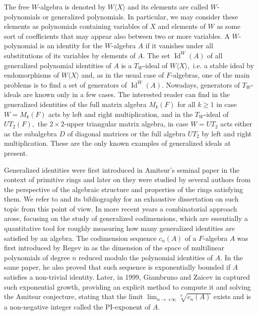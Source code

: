 \documentclass[reqno]{amsart}
\theoremstyle{definition}
\numberwithin{equation}{section}
\numberwithin{theorem}{section}
\newcommand{\W}{W\langle X\rangle}
\DeclareMathOperator{\I}{Id}
\begin{document}
The free $W$-algebra is denoted by $\W$ and its elements are called $W$-polynomials or generalized polynomials. In particular, we may consider these elements as polynomials containing variables of $X$ and elements of $W$ as some sort of coefficients that may appear also between two or more variables. A $W$-polynomial is an identity for the $W$-algebra $A$ if it vanishes under all substitutions of its variables by elements of $A.$ The set $\I^W(A)$ of all generalized polynomial identities of $A$ is a $T_W$-ideal of $\W,$ i.e. a stable ideal by endomorphisms of $\W$ and, as in the usual case of $F$-algebras, one of the main problems is to find a set of generators of $\I^W(A).$ Nowadays, generators of $T_W$-ideals are known only in a few cases. The interested reader can find in \cite[Proposition 6.5.5]{BeidarMartindaleMikhalevm1996} the generalized identities of the full matrix algebra $M_k(F)$ for all $k\geq 1$ in case $W= M_k(F)$ acts by left and right multiplication, and in \cite{MartinoRizzo2024} the $T_W$-ideal of $UT_2(F),$ the $2\times 2$-upper triangular matrix algebra, in case $W=UT_2$ acts either as the subalgebra $D$ of diagonal matrices or the full algebra $UT_2$ by left and right multiplication.
These are the only known examples of generalized ideals at present.

Generalized identities were first introduced in Amitsur’s seminal paper \cite{Amitsur1965} in the context of primitive rings and later on they were studied by several authors from the perspective of the algebraic structure and properties of the rings satisfying them. We refer to \cite{BeidarMartindaleMikhalevm1996} and its bibliography for an exhaustive dissertation on such topic from this point of view. In more recent years a combinatorial approach arose, focusing on the study of generalized codimensions, which are essentially a quantitative tool for roughly measuring how many generalized identities are satisfied by an algebra. The codimension sequence $c_n(A)$ of a $F$-algebra $A$ was first introduced by Regev in \cite{Regev1972} as the dimension of the space of multilinear polynomials of degree $n$ reduced modulo the polynomial identities of $A.$ In the same paper, he also proved that such sequence is exponentially bounded if $A$ satisfies a non-trivial identity. Later, in 1999, Giambruno and Zaicev in \cite{GiambrunoZaicev1999} captured such exponential growth, providing an explicit method to compute it and solving the Amitsur conjecture, stating that the limit $\lim_{n\rightarrow +\infty} \sqrt[n]{c_n(A)}$ exists and is a non-negative integer called the PI-exponent of $A.$ 
\end{document}
